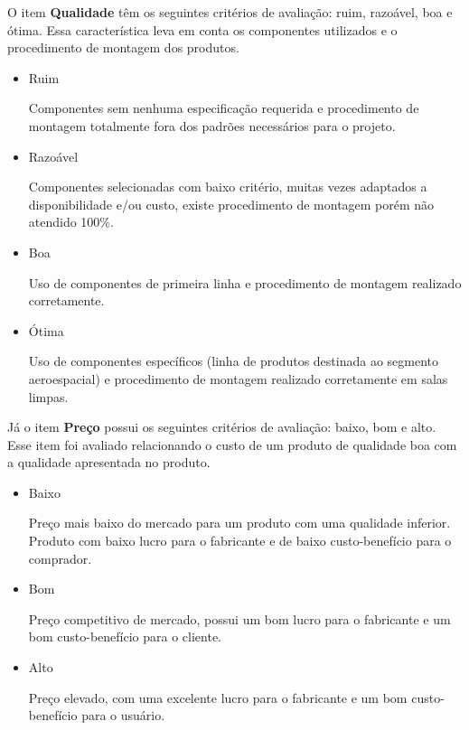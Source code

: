 \documentclass[
	12pt,				%
	openright,			%
	oneside,			%
	a4paper,			%
	english,			%
	french,				%
	spanish,			%
	brazil				%
	]{abntex2}
\begin{document}
	O item \textbf{Qualidade} têm os seguintes critérios de avaliação: ruim, razoável, boa e ótima. Essa característica leva em conta os componentes utilizados e o procedimento de montagem dos produtos.
	
	\begin{itemize}
		\item Ruim
		 
		Componentes sem nenhuma especificação requerida e procedimento de montagem totalmente fora dos padrões necessários para o projeto.
		
		\item Razoável
		
		Componentes selecionadas com baixo critério, muitas vezes adaptados a disponibilidade e/ou custo, existe procedimento de montagem porém não atendido 100\%.
		
		\item Boa
		
		Uso de componentes de primeira linha e procedimento de montagem realizado corretamente.
		
		\item Ótima
		
		Uso de componentes específicos (linha de produtos destinada ao segmento aeroespacial) e procedimento de montagem realizado corretamente em salas limpas.		
		
	\end{itemize}

	 Já o item \textbf{Preço} possui os seguintes critérios de avaliação: baixo, bom e alto. Esse item foi avaliado relacionando o custo de um produto de qualidade boa com a qualidade apresentada no produto.
	 
	 \begin{itemize}
	 
	 	\item Baixo
	 	
	 	Preço mais baixo do mercado para um produto com uma qualidade inferior. Produto com baixo lucro para o fabricante e de baixo custo-benefício para o comprador.
	 	
	 	\item Bom
	 	
	 	Preço competitivo de mercado, possui um bom lucro para o fabricante e um bom custo-benefício para o cliente.
	 	
	 	\item Alto
	 	
	 	Preço elevado, com uma excelente lucro para o fabricante e um bom custo-benefício para o usuário.
	 	
	 \end{itemize}
	
\end{document}
